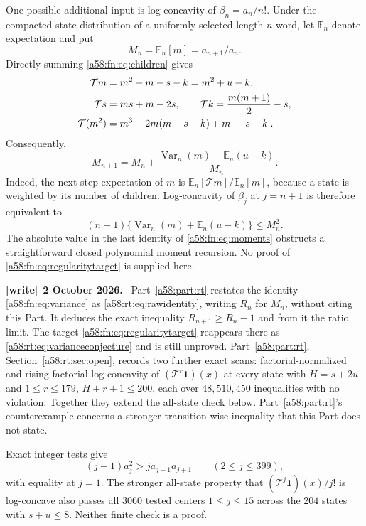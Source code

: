 \documentclass[11pt,letterpaper]{article}
\theoremstyle{remark}
\newcommand{\TT}{\mathcal T}
\newcommand{\one}{\mathbf 1}
\newcommand{\E}{\mathbb E}
\newcommand{\Var}{\operatorname{Var}}
\newenvironment{writenote}[1][]{\par\smallskip\begingroup\small
 \noindent\textbf{[write]}\if\relax\detokenize{#1}\relax\else~\textbf{#1.}\fi\ }%
 {\par\endgroup\smallskip}
\begin{document}
One possible additional input is log-concavity of $\beta_n=a_n/n!$. Under the compacted-state distribution of a uniformly selected length-$n$ word, let $\E_n$ denote expectation and put
\[
 M_n=\E_n[m]=a_{n+1}/a_n.
\]
Directly summing \eqref{a58:fn:eq:children} gives
\begin{align}\label{a58:fn:eq:moments}
 \TT m&=m^2+m-s-k=m^2+u-k,\notag\\
 \TT s&=ms+m-2s,\qquad
 \TT k=\frac{m(m+1)}2-s,\\
 \TT(m^2)&=m^3+2m(m-s-k)+m-|s-k|.\notag
\end{align}
Consequently,
\begin{equation}\label{a58:fn:eq:variance}
 M_{n+1}=M_n+\frac{\Var_n(m)+\E_n(u-k)}{M_n}.
\end{equation}
Indeed, the next-step expectation of $m$ is $\E_n[\TT m]/\E_n[m]$, because a state is weighted by its number of children. Log-concavity of $\beta_j$ at $j=n+1$ is therefore equivalent to
\begin{equation}\label{a58:fn:eq:regularitytarget}
 (n+1)\{\Var_n(m)+\E_n(u-k)\}\le M_n^2.
\end{equation}
The absolute value in the last identity of \eqref{a58:fn:eq:moments} obstructs a straightforward closed polynomial moment recursion. No proof of \eqref{a58:fn:eq:regularitytarget} is supplied here.
\begin{writenote}[2 October 2026]
Part~\ref{a58:part:rt} restates the identity \eqref{a58:fn:eq:variance} as \eqref{a58:rt:eq:rawidentity}, writing $R_n$ for $M_n$, without citing this Part. It deduces the exact inequality $R_{n+1}\ge R_n-1$ and from it the ratio limit. The target \eqref{a58:fn:eq:regularitytarget} reappears there as \eqref{a58:rt:eq:varianceconjecture} and is still unproved. Part~\ref{a58:part:rt}, Section~\ref{a58:rt:sec:open}, records two further exact scans: factorial-normalized and rising-factorial log-concavity of $(\TT^r\one)(x)$ at every state with $H=s+2u$ and $1\le r\le179$, $H+r+1\le200$, each over $48{,}510{,}450$ inequalities with no violation. Together they extend the all-state check below. Part~\ref{a58:part:rt}'s counterexample concerns a stronger transition-wise inequality that this Part does not state.
\end{writenote}

Exact integer tests give
\[
 (j+1)a_j^2>j a_{j-1}a_{j+1}\qquad(2\le j\le399),
\]
with equality at $j=1$. The stronger all-state property that $(\TT^j\one)(x)/j!$ is log-concave also passes all $3060$ tested centers $1\le j\le15$ across the $204$ states with $s+u\le8$. Neither finite check is a proof.
\end{document}
